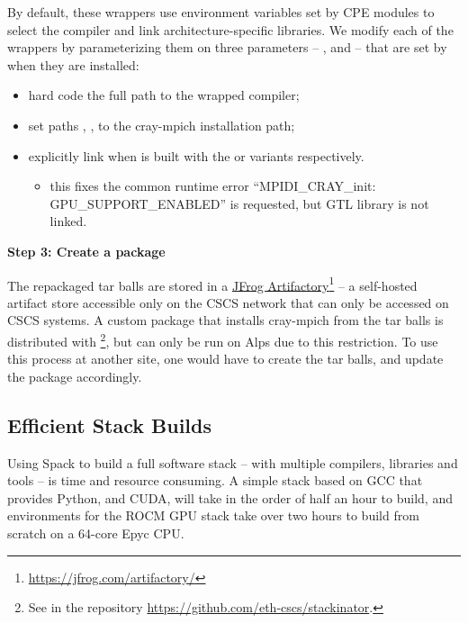 By default, these wrappers use environment variables set by CPE modules to select the compiler and link architecture-specific libraries.
We modify each of the wrappers by parameterizing them on three parameters -- ,  and  --
that are set by \spack when they are installed:
\begin{itemize}
    \item hard code the full path to the wrapped compiler;
    \item set paths , , to the cray-mpich \spack installation path;
    \item explicitly link   when \craympich is built with the  or  variants respectively.
    \begin{itemize}
          \item this fixes the common runtime error ``MPIDI\_CRAY\_init: GPU\_SUPPORT\_ENABLED'' is requested, but GTL library is not linked.
    \end{itemize}
\end{itemize}

\noindent\textbf{Step 3: Create a \spack package}

The repackaged \craympich tar balls are stored in a \href{https://jfrog.com/artifactory/}{JFrog Artifactory}\footnote{\url{https://jfrog.com/artifactory/}} -- a self-hosted artifact store accessible only on the CSCS network that can only be accessed on CSCS systems.
A custom \spack package that installs cray-mpich from the tar balls is distributed with \stackinator\footnote{See  in the repository \url{https://github.com/eth-cscs/stackinator}.}, but can only be run on Alps due to this restriction.
To use this process at another site, one would have to create the tar balls, and update the \spack package accordingly.

\subsection{Efficient Stack Builds}
\label{sec:faster-builds}

Using Spack to build a full software stack -- with multiple compilers, libraries and tools -- is time and resource consuming.
A simple stack based on GCC that provides Python, \craympich and CUDA, will take in the order of half an hour to build, and environments for the ROCM GPU stack take over two hours to build from scratch on a 64-core Epyc CPU.

